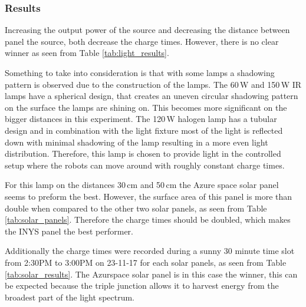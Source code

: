 \subsubsection{Results}

Increasing the output power of the source and decreasing the distance between panel the source, both decrease the charge times.
However, there is no clear winner as seen from Table \ref{tab:light_results}.

Something to take into consideration is that with some lamps a shadowing pattern is observed due to the construction of the lamps.
The 60\,W and 150\,W IR lamps have a spherical design, that creates an uneven circular shadowing pattern on the surface the lamps are shining on. 
This becomes more significant on the bigger distances in this experiment.
The 120\,W halogen lamp has a tubular design and in combination with the light fixture most of the light is reflected down with minimal shadowing of the lamp resulting in a more even light distribution.
Therefore, this lamp is chosen to provide light in the controlled setup where the robots can move around with roughly constant charge times.

For this lamp on the distances 30\,cm and 50\,cm the Azure space solar panel seems to preform the best.
However, the surface area of this panel is more than double when compared to the other two solar panels, as seen from Table \ref{tab:solar_panels}.
Therefore the charge times should be doubled, which makes the INYS panel the best performer.

Additionally the charge times were recorded during a sunny 30 minute time slot from 2:30PM to 3:00PM on 23-11-17 for each solar panels, as seen from Table \ref{tab:solar_results}.
The Azurspace solar panel is in this case the winner, this can be expected because the triple junction allows it to harvest energy from the broadest part of the light spectrum.


